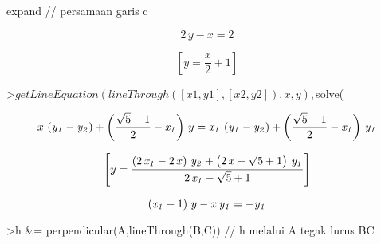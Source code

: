 \documentclass[a4paper,10pt]{article}
\begin{document}
\begin{eulernotebook}
\begin{eulercomment}
\begin{eulercomment}
\begin{eulercomment}
\begin{eulercomment}
\begin{eulercomment}
\begin{eulercomment}
\begin{eulercomment}
\begin{eulercomment}
\begin{eulercomment}
\begin{eulercomment}
\begin{eulercomment}
\begin{eulercomment}
\begin{eulercomment}
\begin{eulercomment}
\begin{eulercomment}
\begin{eulercomment}
\begin{eulercomment}
\begin{eulercomment}
\begin{eulercomment}
\begin{eulercomment}
\begin{eulercomment}
\begin{eulercomment}
\begin{eulercomment}
\begin{eulercomment}
\begin{eulercomment}
\begin{eulercomment}
\begin{eulercomment}
\begin{eulercomment}
\begin{eulercomment}
\begin{eulercomment}
\begin{eulercomment}
\begin{eulercomment}
\begin{eulercomment}
\begin{eulercomment}
\begin{eulercomment}
\begin{eulercomment}
\begin{eulercomment}
\begin{eulercomment}
\begin{eulercomment}
\begin{eulercomment}
\begin{eulercomment}
\begin{eulercomment}
\begin{eulercomment}
\begin{eulercomment}
\begin{eulercomment}
\begin{eulercomment}
\begin{eulercomment}
\begin{eulercomment}
\begin{eulercomment}
\begin{eulercomment}
\begin{eulercomment}
\begin{eulercomment}
\begin{eulercomment}
\begin{eulercomment}
\begin{eulercomment}
\begin{eulercomment}
\begin{eulercomment}
\begin{eulercomment}
\begin{eulercomment}
\begin{eulercomment}
\begin{eulercomment}
\begin{eulercomment}
\begin{eulerprompt}
expand // persamaan garis c
\end{eulerprompt}
\begin{eulerformula}
\[
2\,y-x=2
\]
\end{eulerformula}
\begin{eulerformula}
\[
\left[ y=\frac{x}{2}+1 \right] 
\]
\end{eulerformula}
\begin{eulerprompt}
>$getLineEquation(lineThrough([x1,y1],[x2,y2]),x,y), $solve(%
\end{eulerprompt}
\begin{eulerformula}
\[
x\,\left({\it y_1}-{\it y_2}\right)+\left(\frac{\sqrt{5}-1}{2}-
 {\it x_1}\right)\,y={\it x_1}\,\left({\it y_1}-{\it y_2}\right)+
 \left(\frac{\sqrt{5}-1}{2}-{\it x_1}\right)\,{\it y_1}
\]
\end{eulerformula}
\begin{eulerformula}
\[
\left[ y=\frac{\left(2\,{\it x_1}-2\,x\right)\,{\it y_2}+\left(2\,x
 -\sqrt{5}+1\right)\,{\it y_1}}{2\,{\it x_1}-\sqrt{5}+1} \right] 
\]
\end{eulerformula}
\begin{eulerformula}
\[
\left({\it x_1}-1\right)\,y-x\,{\it y_1}=-{\it y_1}
\]
\end{eulerformula}
\begin{eulerprompt}
>h &= perpendicular(A,lineThrough(B,C)) // h melalui A tegak lurus BC
\end{eulerprompt}
\begin{euleroutput}
  
                               
\end{euleroutput}
\end{eulercomment}
\end{eulercomment}
\end{eulercomment}
\end{eulercomment}
\end{eulercomment}
\end{eulercomment}
\end{eulercomment}
\end{eulercomment}
\end{eulercomment}
\end{eulercomment}
\end{eulercomment}
\end{eulercomment}
\end{eulercomment}
\end{eulercomment}
\end{eulercomment}
\end{eulercomment}
\end{eulercomment}
\end{eulercomment}
\end{eulercomment}
\end{eulercomment}
\end{eulercomment}
\end{eulercomment}
\end{eulercomment}
\end{eulercomment}
\end{eulercomment}
\end{eulercomment}
\end{eulercomment}
\end{eulercomment}
\end{eulercomment}
\end{eulercomment}
\end{eulercomment}
\end{eulercomment}
\end{eulercomment}
\end{eulercomment}
\end{eulercomment}
\end{eulercomment}
\end{eulercomment}
\end{eulercomment}
\end{eulercomment}
\end{eulercomment}
\end{eulercomment}
\end{eulercomment}
\end{eulercomment}
\end{eulercomment}
\end{eulercomment}
\end{eulercomment}
\end{eulercomment}
\end{eulercomment}
\end{eulercomment}
\end{eulercomment}
\end{eulercomment}
\end{eulercomment}
\end{eulercomment}
\end{eulercomment}
\end{eulercomment}
\end{eulercomment}
\end{eulercomment}
\end{eulercomment}
\end{eulercomment}
\end{eulercomment}
\end{eulercomment}
\end{eulercomment}
\end{eulernotebook}
\end{document}
